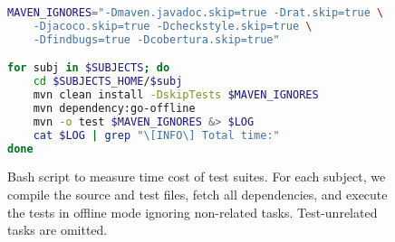 \begin{figure}[h!]
\centering
\scriptsize
{}
\begin{lstlisting}[language=Bash]
MAVEN_IGNORES="-Dmaven.javadoc.skip=true -Drat.skip=true \
    -Djacoco.skip=true -Dcheckstyle.skip=true \
    -Dfindbugs=true -Dcobertura.skip=true"

for subj in $SUBJECTS; do
    cd $SUBJECTS_HOME/$subj
    mvn clean install -DskipTests $MAVEN_IGNORES
    mvn dependency:go-offline
    mvn -o test $MAVEN_IGNORES &> $LOG
    cat $LOG | grep "\[INFO\] Total time:"
done
\end{lstlisting}
\caption{\label{fig:mvn-execution} Bash script to measure time cost of
  test suites. For each subject, we compile the source and test files,
  fetch all dependencies, and execute the tests in offline mode
  ignoring non-related tasks. Test-unrelated tasks are omitted.}
\end{figure}
